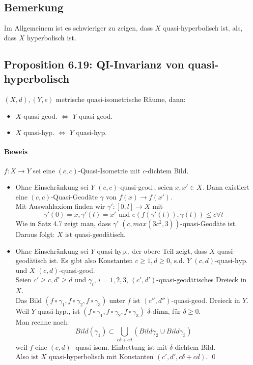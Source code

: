 \documentclass{article}
\begin{document}
\subsection{Bemerkung}
Im Allgemeinem ist es schwieriger zu zeigen, dass $X$ quasi-hyperbolisch ist, als, dass $X$ hyperbolisch ist.

\subsection{Proposition 6.19: QI-Invarianz von quasi-hyperbolisch}
$(X,d), (Y, e)$ metrische quasi-isometrische Räume, dann:
\begin{itemize}
	\item $X$ quasi-geod. $\Longleftrightarrow$ $Y$ quasi-geod.
	\item $X$ quasi-hyp. $\Longleftrightarrow$ $Y$ quasi-hyp.
\end{itemize}



\paragraph{Beweis}
$f:X \rightarrow Y$ sei eine $(c,c)$-Quasi-Isometrie mit $c$-dichtem Bild.
\begin{itemize}
	\item Ohne Einschränkung sei $Y$  $(c,c)$-quasi-geod., seien $x,x'\in X$. Dann existiert eine $(c,c)$-Quasi-Geodäte $\gamma$ von $f(x)\rightarrow f(x')$.\\
	Mit Auswahlaxiom finden wir $\gamma':[0,l] \rightarrow X$ mit 
	\[\gamma'(0) = x, \gamma'(l)  = x' \text{ und } e(f(\gamma'(t)), \gamma(t)) \leq c \forall t \]
	Wie in Satz 4.7 zeigt man, dass $\gamma'$ $(c, max(3c^2, 3))$-quasi-Geodäte ist.\\
	Daraus folgt: $X$ ist quasi-geodätisch.
	
	\item Ohne Einschränkung sei $Y$  quasi-hyp., der obere Teil zeigt, dass $X$ quasi-geodätisch ist. Es gibt also Konstanten $c\geq 1, d \geq 0$, s.d. $Y$ $(c,d)$-quasi-hyp. und $X$ $(c,d)$-quasi-geod.\\
	Seien $c' \geq  c, d' \geq d$ und $\gamma_i$, $i = 1,2,3$, $(c',d')$-quasi-geodätisches Dreieck in $X$.\\
	Das Bild $(f\circ \gamma_1, f\circ \gamma_2, f\circ \gamma_3)$ unter $f$ ist $(c'', d'')$-quasi-geod. Dreieck in $Y$.\\
	Weil $Y$ quasi-hyp., ist $(f\circ \gamma_1, f\circ \gamma_2, f\circ \gamma_3 )$ $\delta$-dünn, für $\delta \geq 0$.\\
	Man rechne nach:
	\[Bild(\gamma_1) \subset \bigcup_{c\delta + cd}(Bild\gamma_2 \cup Bild \gamma_3) \]
	weil $f$ eine $(c,d)$- quasi-isom. Einbettung ist mit $\delta$-dichtem Bild.\\
	Also ist $X$ quasi-hyperbolisch mit Konstanten $(c', d', c\delta + cd)$. \qed
\end{itemize}
\end{document}
